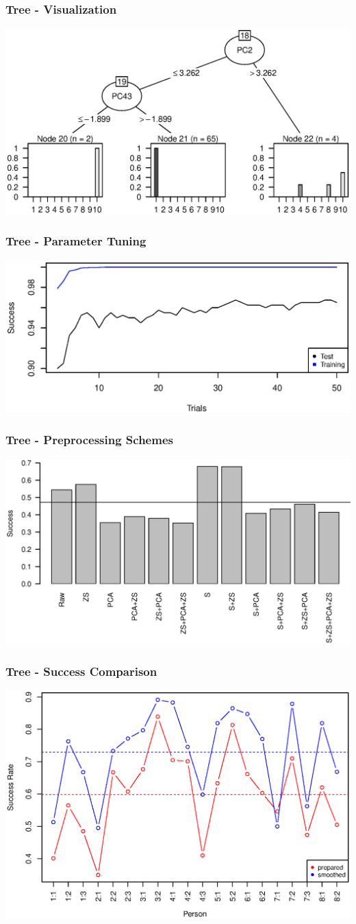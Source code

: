 \begin{frame}
\frametitle{Tree - Visualization}
\includegraphics[width = 0.9 \textwidth]{graphics/tree_section}
\end{frame}

\begin{frame}
\frametitle{Tree - Parameter Tuning}
\includegraphics[width = 0.9 \textwidth]{graphics/tree_boost_overfitting}
\end{frame}

\begin{frame}
\frametitle{Tree - Preprocessing Schemes}
\includegraphics[width = 0.9 \textwidth]{graphics/tree_total_all}
\end{frame}

\begin{frame}
\frametitle{Tree - Success Comparison}
\includegraphics[width = 0.9 \textwidth]{graphics/tree_performance_all_combined}
\end{frame}
